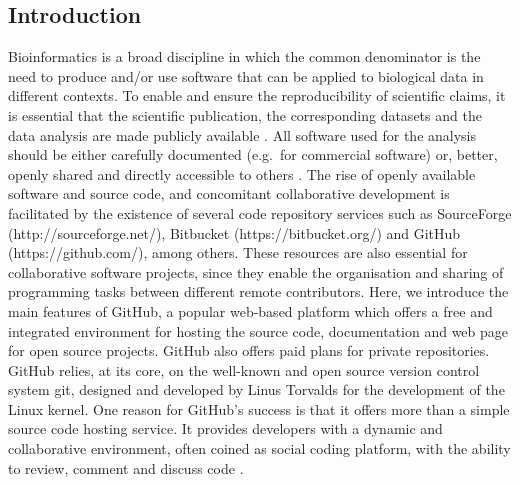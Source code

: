 \documentclass[10pt,letterpaper]{article}
\begin{document}

\linenumbers

\subsection*{Introduction}\label{introduction}

Bioinformatics is a broad discipline in which the common denominator is
the need to produce and/or use software that can be applied to
biological data in different contexts. To enable and ensure the
reproducibility of scientific claims, it is essential that the
scientific publication, the corresponding datasets and the data analysis
are made publicly available \cite{Goodman:2014,Perez-Riverol:2015}. All
software used for the analysis should be either carefully documented
(e.g.~for commercial software) or, better, openly shared and directly
accessible to others \cite{Osborne:2014,Vihinen:2015}. The rise of
openly available software and source code, and concomitant collaborative
development is facilitated by the existence of several code repository
services such as SourceForge (http://sourceforge.net/), Bitbucket
(https://bitbucket.org/) and GitHub (https://github.com/), among others.
These resources are also essential for collaborative software projects,
since they enable the organisation and sharing of programming tasks
between different remote contributors. Here, we introduce the main
features of GitHub, a popular web-based platform which offers a free and
integrated environment for hosting the source code, documentation and
web page for open source projects. GitHub also offers paid plans for
private repositories. GitHub relies, at its core, on the well-known and
open source version control system git, designed and developed by Linus
Torvalds for the development of the Linux kernel. One reason for
GitHub's success is that it offers more than a simple source code
hosting service. It provides developers with a dynamic and collaborative
environment, often coined as social coding platform, with the ability to
review, comment and discuss code \cite{Dabbish:2012}.
\end{document}
